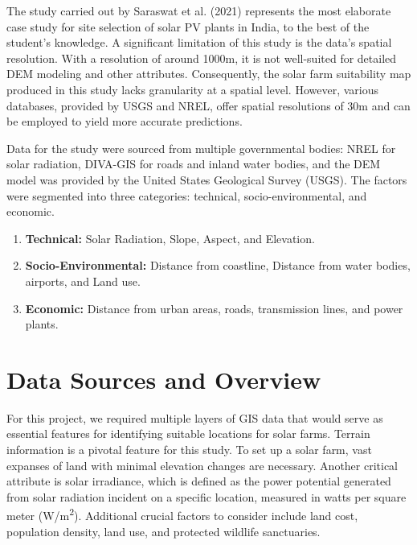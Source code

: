\documentclass[a4paper,12pt]{Classes/RoboticsLaTeX}
\begin{document}
	The study carried out by Saraswat et al. (2021) represents the most elaborate case study for site selection of solar \ac{PV} plants in India, 
	to the best of the student's knowledge\cite{saraswat2021}. A significant limitation of this study is the data's spatial resolution. With a resolution of 
	around 1000m, it is not well-suited for detailed DEM modeling and other attributes. Consequently, the solar farm suitability map produced in this study lacks
	 granularity at a spatial level. However, various databases, provided by USGS and \ac{NREL}, offer spatial resolutions of 30m and can be employed to yield more accurate predictions.

	Data for the study were sourced from multiple governmental bodies: \ac{NREL} for solar radiation, DIVA-GIS for roads and inland water bodies, and the DEM model was provided by the United States Geological Survey (USGS). The factors were segmented into three categories: technical, socio-environmental, and economic.
	\begin{enumerate}
		\item \textbf{Technical:} Solar Radiation, Slope, Aspect, and Elevation.
		\item \textbf{Socio-Environmental:} Distance from coastline, Distance from water bodies, airports, and Land use.
		\item \textbf{Economic:} Distance from urban areas, roads, transmission lines, and power plants.
	\end{enumerate}

	\section{Data Sources and Overview}

	For this project, we required multiple layers of GIS data that would serve as essential features for identifying suitable locations for solar farms. 
	Terrain information is a pivotal feature for this study. To set up a solar farm, vast expanses of land with minimal elevation changes are necessary. 
	Another critical attribute is solar irradiance, which is defined as the power potential generated from solar radiation incident on a specific location, 
	measured in watts per square meter (W/m\textsuperscript{2}). Additional crucial factors to consider include land cost, population density, land use, and 
	protected wildlife sanctuaries.
\end{document}
